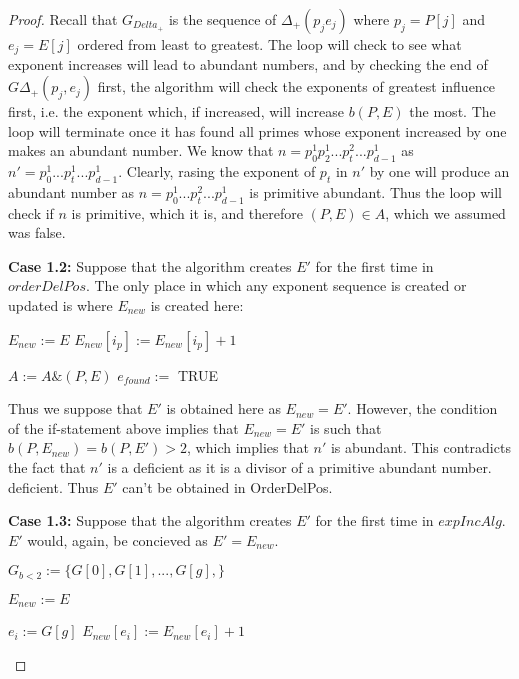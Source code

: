 \documentclass[../paper.tex]{subfiles}
\begin{document}
\begin{proof}
  Recall that $G_{Delta_+}$ is the sequence of $\Delta_+(p_j e_j)$
where $p_j = P[j]$ and $e_j = E[j]$ ordered from least to greatest.
The loop will check to see what exponent increases will lead to
abundant numbers, and by checking the end of $G\Delta_+(p_j, e_j)$
first, the algorithm will check the exponents of greatest
influence first, i.e. the exponent which, if increased, will
increase $b(P,E)$ the most. The loop will terminate once it
has found all primes whose exponent increased by one makes an
abundant number. We know that $n = p_0^1 p_2^1 ... p_t^2...
p_{d-1}^1$ as $n' = p_0^1 ... p_t^1 ... p_{d-1}^1$.
 Clearly, rasing the exponent of $p_t$ in $n'$ by one will
produce an abundant number as $n = p_0^{1} ... p_t^{2} ...
p_{d-1}^1$ is primitive abundant. Thus the loop will check if $n$
is primitive, which it is, and therefore $(P,E) \in A$, which we
assumed was false.

\textbf{Case 1.2:}
  Suppose that the algorithm creates $E'$ for the first time in
$orderDelPos$. The only place in which any exponent sequence is created
or updated is where $E_{new}$ is created here:
\begin{algorithmic}
 
		\STATE $E_{new} := E$
		\STATE $E_{new}[ i_p ] := E_{new}[ i_p ] + 1 $
		
			\STATE $A := A\&(P,E)$
			\STATE $e_{found} := $ TRUE
		\ENDIF 

  \ENDIF
\end{algorithmic}

  Thus we suppose that $E'$ is obtained here as $E_{new} = E'$.
However, the condition of the if-statement above implies that
$E_{new} = E'$ is such that $b(P,E_{new}) = b(P,E') > 2$, which
implies that $n'$ is abundant. This contradicts the fact that $n'$
is a deficient as it is a divisor of a primitive abundant number.
deficient. Thus $E'$ can't be obtained in OrderDelPos.

\textbf{Case 1.3:}
  Suppose that the algorithm creates $E'$ for the first time in
$expIncAlg$. $E'$ would, again, be concieved as $E' = E_{new}$. 

\begin{algorithmic}
  \STATE $G_{b < 2} := \{G[0], G[1], 
	                       ..., G[g],\}$


  	\STATE $E_{new} := E$
		
		\STATE $e_i := G[g]$
		\STATE $E_{new}[e_i] := E_{new}[e_i] + 1$


\end{algorithmic}
\end{proof}
\end{document}
